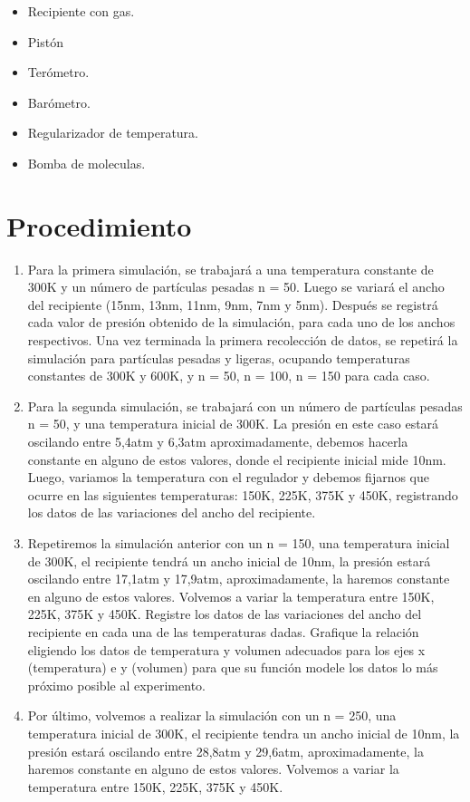 \documentclass[]{article}
\begin{document}
\begin{itemize}
      \item Recipiente con gas.
      \item Pistón
      \item Terómetro.
      \item Barómetro.
      \item Regularizador de temperatura.
      \item Bomba de moleculas.
\end{itemize}

\section{Procedimiento}
\begin{enumerate}
    \item Para la primera simulación, se trabajará a una temperatura constante de 300K y un número de partículas pesadas n = 50. Luego se  variará el ancho del recipiente (15nm, 13nm, 11nm,
    9nm, 7nm y 5nm). Después se registrá cada valor de presión obtenido de la simulación, para cada
    uno de los anchos respectivos.
    Una vez terminada la primera recolección de datos, se repetirá la simulación para partículas pesadas y ligeras, ocupando temperaturas constantes de 300K y 600K, y n = 50, n = 100, n = 150
    para cada caso. 

    \item Para la segunda simulación, se trabajará con un número de partículas pesadas n = 50, y una
    temperatura inicial de 300K. La presión en este caso estará oscilando entre 5,4atm y 6,3atm
    aproximadamente, debemos hacerla constante en alguno de estos valores, donde el recipiente inicial mide 10nm. Luego, 
    variamos la temperatura con el regulador y debemos fijarnos que ocurre en las siguientes temperaturas: 
    150K, 225K, 375K y 450K, registrando los datos de las variaciones del ancho del recipiente.
    

    \item Repetiremos la simulación anterior con un  n = 150, una temperatura inicial de 300K, el recipiente
    tendrá un ancho inicial de 10nm, la presión estará oscilando entre 17,1atm y 17,9atm, aproximadamente, la haremos constante
    en alguno de estos valores. Volvemos a variar la temperatura entre 150K, 225K, 375K y 450K. Registre los datos de las variaciones 
    del ancho del recipiente en cada una de las temperaturas dadas.
    Grafique la relación eligiendo los datos de temperatura y volumen adecuados para los ejes x (temperatura) e y (volumen) para que 
    su función modele los datos lo más próximo posible al experimento.

    \item  Por último, volvemos a realizar la simulación con un n = 250, una temperatura inicial de 300K, el
    recipiente tendra un ancho inicial de 10nm, la presión estará oscilando entre 28,8atm y 29,6atm,
    aproximadamente, la haremos constante en alguno de estos valores. Volvemos a variar la temperatura entre 
    150K, 225K, 375K y 450K.
    
    
\end{enumerate}
\end{document}
